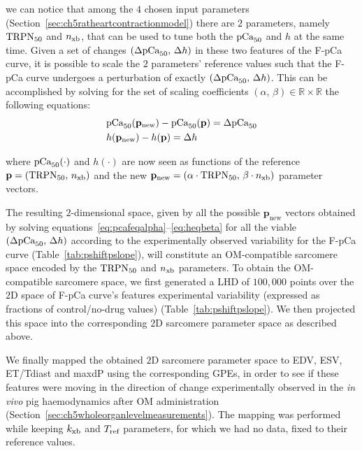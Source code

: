 \noindent
we can notice that among the $4$ chosen input parameters (Section~\ref{sec:ch5ratheartcontractionmodel}) there are $2$ parameters, namely $\textrm{TRPN}_{50}$ and $n_{\textrm{xb}}$, that can be used to tune both the $\textrm{pCa}_{50}$ and $h$ at the same time. Given a set of changes $(\Delta\textrm{pCa}_{50},\,\Delta h)$ in these two features of the F-pCa curve, it is possible to scale the $2$ parameters' reference values such that the F-pCa curve undergoes a perturbation of exactly $(\Delta\textrm{pCa}_{50},\,\Delta h)$. This can be accomplished by solving for the set of scaling coefficients $(\alpha,\,\beta)\in\mathbb{R}\times\mathbb{R}$ the following equations:
%
\begin{align}
    & \textrm{pCa}_{50}(\mathbf{p}_{\textrm{new}}) - \textrm{pCa}_{50}(\mathbf{p}) = \Delta\textrm{pCa}_{50} \label{eq:pcafeqalpha} \\
    & h(\mathbf{p}_{\textrm{new}}) - h(\mathbf{p}) = \Delta h \label{eq:heqbeta}
\end{align}

\vspace{0.2cm}\noindent
where $\textrm{pCa}_{50}(\cdot)$ and $h(\cdot)$ are now seen as functions of the reference $\mathbf{p}=(\textrm{TRPN}_{50},\,n_{\textrm{xb}})$ and the new $\mathbf{p}_{\textrm{new}}=(\alpha\cdot\textrm{TRPN}_{50},\,\beta\cdot n_{\textrm{xb}})$ parameter vectors.

\vspace{0.2cm}
The resulting $2$-dimensional space, given by all the possible $\mathbf{p}_{\textrm{new}}$ vectors obtained by solving equations~\ref{eq:pcafeqalpha}--\ref{eq:heqbeta} for all the viable $(\Delta\textrm{pCa}_{50},\,\Delta h)$ according to the experimentally observed variability for the F-pCa curve (Table~\ref{tab:pshiftpslope}), will constitute an OM-compatible sarcomere space encoded by the $\textrm{TRPN}_{50}$ and $n_{\textrm{xb}}$ parameters. To obtain the OM-compatible sarcomere space, we first generated a LHD of $100,000$ points over the $2$D space of F-pCa curve's features experimental variability (expressed as fractions of control/no-drug values) (Table~\ref{tab:pshiftpslope}). We then projected this space into the corresponding $2$D sarcomere parameter space as described above.

\vspace{0.2cm}
We finally mapped the obtained $2$D sarcomere parameter space to EDV, ESV, ET/Tdiast and maxdP using the corresponding GPEs, in order to see if these features were moving in the direction of change experimentally observed in the \textit{in vivo} pig haemodynamics after OM administration (Section~\ref{sec:ch5wholeorganlevelmeasurements}). The mapping was performed while keeping $k_{\textrm{xb}}$ and $T_{\textrm{ref}}$ parameters, for which we had no data, fixed to their reference values.


